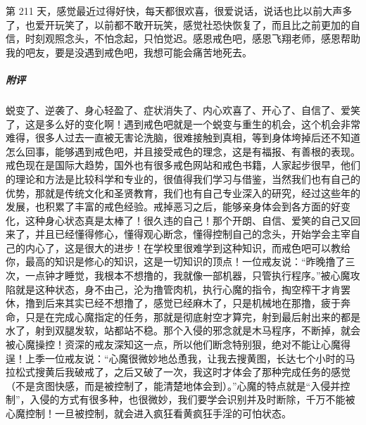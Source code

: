 \begin{case}
    第 211 天，感觉最近过得好快，每天都很欢喜，很爱说话，说话也比以前大声多了，也爱开玩笑了，以前都不敢开玩笑，感觉社恐快恢复了，而且比之前更加的自信，时刻观照念头，不怕念起，只怕觉迟。感恩戒色吧，感恩飞翔老师，感恩帮助我的吧友，要是没遇到戒色吧，我想可能会痛苦地死去。
    \subparagraph{附评} 蜕变了、逆袭了、身心轻盈了、症状消失了、内心欢喜了、开心了、自信了、爱笑了，这是多么好的变化啊！遇到戒色吧就是一个蜕变与重生的机会，这个机会非常难得，很多人过去一直被无害论洗脑，很难接触到真相，等到身体垮掉后还不知道怎么回事，能够遇到戒色吧，并且接受戒色的理念，这是有福报、有善根的表现。戒色现在是国际大趋势，国外也有很多戒色网站和戒色书籍，人家起步很早，他们的理论和方法是比较科学和专业的，很值得我们学习与借鉴，当然我们也有自己的优势，那就是传统文化和圣贤教育，我们也有自己专业深入的研究，经过这些年的发展，也积累了丰富的戒色经验。戒掉恶习之后，能够亲身体会到各方面的好变化，这种身心状态真是太棒了！很久违的自己！那个开朗、自信、爱笑的自己又回来了，并且已经懂得修心，懂得观心断念，懂得控制自己的念头，开始学会主宰自己的内心了，这是很大的进步！在学校里很难学到这种知识，而戒色吧可以教给你，最高的知识是修心的知识，这是一切知识的顶点！一位戒友说：“昨晚撸了三次，一点钟才睡觉，我根本不想撸的，我就像一部机器，只管执行程序。”被心魔攻陷就是这种状态，身不由己，沦为撸管肉机，执行心魔的指令，掏空榨干才肯罢休，撸到后来其实已经不想撸了，感觉已经麻木了，只是机械地在那撸，疲于奔命，只是在完成心魔指定的任务，那就是彻底射空才算完，射到最后射出来的都是水了，射到双腿发软，站都站不稳。那个入侵的邪念就是木马程序，不断掉，就会被心魔操控！资深的戒友深知这一点，所以他们断念特别狠，绝对不能让心魔得逞！上季一位戒友说：“心魔很微妙地怂恿我，让我去搜黄图，长达七个小时的马拉松式搜黄后我破戒了，之后又破了一次，我这时才体会了那种完成任务的感觉（不是贪图快感，而是被控制了，能清楚地体会到）。”心魔的特点就是“入侵并控制”，入侵的方式有很多种，也很微妙，我们要学会识别并及时断除，千万不能被心魔控制！一旦被控制，就会进入疯狂看黄疯狂手淫的可怕状态。
\end{case}


